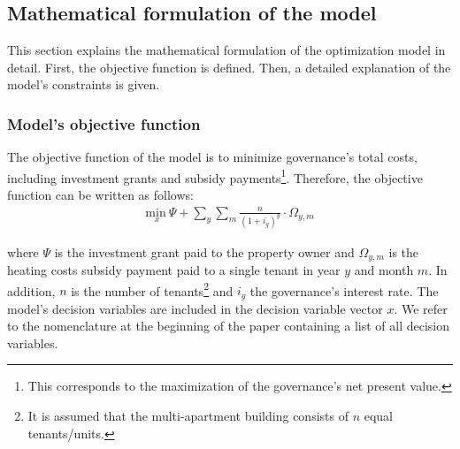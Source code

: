 \subsection{Mathematical formulation of the model}\label{met:formulas}
This section explains the mathematical formulation of the optimization model in detail. First, the objective function is defined. Then, a detailed explanation of the model's constraints is given. 

\subsubsection{Model's objective function}
The objective function of the model is to minimize governance's total costs, including investment grants and subsidy payments\footnote{This corresponds to the maximization of the governance's net present value.}. Therefore, the objective function can be written as follows: 
\begin{align}\label{objective}
\underset{x}{\mathrm{min~}} \Psi + \sum_{y} \sum_{m} \frac{n}{(1+i_g)^y} \cdot \Omega_{y,m}
\end{align}

where $\Psi$ is the investment grant paid to the property owner and $\Omega_{y,m}$ is the heating costs subsidy payment paid to a single tenant in year $y$ and month $m$. In addition, $n$ is the number of tenants\footnote{It is assumed that the multi-apartment building consists of $n$ equal tenants/units.} and $i_g$ the governance's interest rate. The model's decision variables are included in the decision variable vector $x$. We refer to the nomenclature at the beginning of the paper containing a list of all decision variables.

